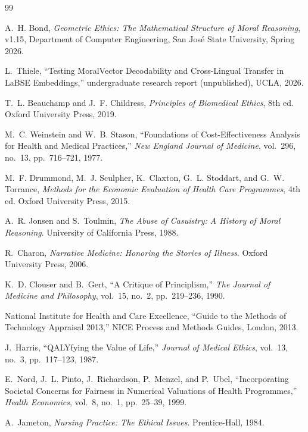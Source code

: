 \documentclass[12pt]{article}
\theoremstyle{definition}
\theoremstyle{remark}
\begin{document}
\begin{thebibliography}{99}

A.~H. Bond, \emph{Geometric Ethics: The Mathematical Structure of Moral Reasoning}, v1.15, Department of Computer Engineering, San Jos\'{e} State University, Spring 2026.

L.~Thiele, ``Testing MoralVector Decodability and Cross-Lingual Transfer in LaBSE Embeddings,'' undergraduate research report (unpublished), UCLA, 2026.

T.~L. Beauchamp and J.~F. Childress, \emph{Principles of Biomedical Ethics}, 8th ed.  Oxford University Press, 2019.

M.~C. Weinstein and W.~B. Stason, ``Foundations of Cost-Effectiveness Analysis for Health and Medical Practices,'' \emph{New England Journal of Medicine}, vol.~296, no.~13, pp.~716--721, 1977.

M.~F. Drummond, M.~J. Sculpher, K.~Claxton, G.~L. Stoddart, and G.~W. Torrance, \emph{Methods for the Economic Evaluation of Health Care Programmes}, 4th ed.  Oxford University Press, 2015.

A.~R. Jonsen and S.~Toulmin, \emph{The Abuse of Casuistry: A History of Moral Reasoning}.  University of California Press, 1988.

R.~Charon, \emph{Narrative Medicine: Honoring the Stories of Illness}.  Oxford University Press, 2006.

K.~D. Clouser and B.~Gert, ``A Critique of Principlism,'' \emph{The Journal of Medicine and Philosophy}, vol.~15, no.~2, pp.~219--236, 1990.

National Institute for Health and Care Excellence, ``Guide to the Methods of Technology Appraisal 2013,'' NICE Process and Methods Guides, London, 2013.

J.~Harris, ``QALYfying the Value of Life,'' \emph{Journal of Medical Ethics}, vol.~13, no.~3, pp.~117--123, 1987.

E.~Nord, J.~L. Pinto, J.~Richardson, P.~Menzel, and P.~Ubel, ``Incorporating Societal Concerns for Fairness in Numerical Valuations of Health Programmes,'' \emph{Health Economics}, vol.~8, no.~1, pp.~25--39, 1999.

A.~Jameton, \emph{Nursing Practice: The Ethical Issues}.  Prentice-Hall, 1984.


\end{thebibliography}
\end{document}
